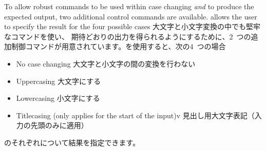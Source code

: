 \documentclass{ltxguide}
\newcommand\jpnewline{\vspace{3pt}\newline}
\DeclareRobustCommand{\jpemph}[1]{%
  \underLine{#1}%
}
\begin{document}
To allow robust commands to be used within case changing \emph{and} to produce
the expected output, two additional control commands are available.
 allows the user to specify the result for the four possible
cases
\jpnewline
大文字と小文字変換の中でも堅牢なコマンドを使い、\jpemph{さらに}期待どおりの出力を得られるようにするために、2~つの追加制御コマンドが用意されています。を使用すると、次の4~つの場合
\begin{itemize}
  \item No case changing\jpnewline
    大文字と小文字の間の変換を行わない
  \item Uppercasing\jpnewline
    大文字にする
  \item Lowercasing\jpnewline
    小文字にする
  \item Titlecasing (only applies for the start of the input)v
   見出し用大文字表記（入力の先頭のみに適用）
\end{itemize}
のそれぞれについて結果を指定できます。
\end{document}
